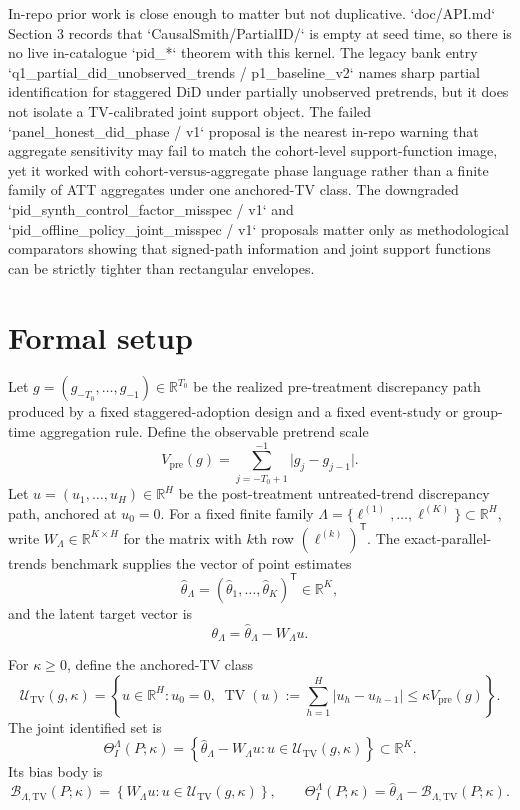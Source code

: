 \documentclass[11pt]{article}
\newcommand{\transpose}{\mathsf{T}}
\newcommand{\R}{\mathbb{R}}
\theoremstyle{definition}
\theoremstyle{plain}
\theoremstyle{remark}
\begin{document}
In-repo prior work is close enough to matter but not duplicative. `doc/API.md` Section 3 records that `CausalSmith/PartialID/` is empty at seed time, so there is no live in-catalogue `pid_*` theorem with this kernel. The legacy bank entry `q1_partial_did_unobserved_trends / p1_baseline_v2` names sharp partial identification for staggered DiD under partially unobserved pretrends, but it does not isolate a TV-calibrated joint support object. The failed `panel_honest_did_phase / v1` proposal is the nearest in-repo warning that aggregate sensitivity may fail to match the cohort-level support-function image, yet it worked with cohort-versus-aggregate phase language rather than a finite family of ATT aggregates under one anchored-TV class. The downgraded `pid_synth_control_factor_misspec / v1` and `pid_offline_policy_joint_misspec / v1` proposals matter only as methodological comparators showing that signed-path information and joint support functions can be strictly tighter than rectangular envelopes.

\section{Formal setup}
Let \(g=(g_{-T_0},\ldots,g_{-1})\in\R^{T_0}\) be the realized pre-treatment discrepancy path produced by a fixed staggered-adoption design and a fixed event-study or group-time aggregation rule. Define the observable pretrend scale
\[
V_{\mathrm{pre}}(g)=\sum_{j=-T_0+1}^{-1}\lvert g_j-g_{j-1}\rvert .
\]
Let \(u=(u_1,\ldots,u_H)\in\R^H\) be the post-treatment untreated-trend discrepancy path, anchored at \(u_0=0\). For a fixed finite family \(\Lambda=\{\ell^{(1)},\ldots,\ell^{(K)}\}\subset\R^H\), write \(W_\Lambda\in\R^{K\times H}\) for the matrix with \(k\)th row \((\ell^{(k)})^\transpose\). The exact-parallel-trends benchmark supplies the vector of point estimates
\[
\hat\theta_\Lambda=(\hat\theta_1,\ldots,\hat\theta_K)^\transpose\in\R^K,
\]
and the latent target vector is
\[
\theta_\Lambda=\hat\theta_\Lambda-W_\Lambda u.
\]

For \(\kappa\ge 0\), define the anchored-TV class
\[
\mathcal U_{\mathrm{TV}}(g,\kappa)
=
\left\{
u\in\R^H:
u_0=0,\;
\operatorname{TV}(u):=\sum_{h=1}^H \lvert u_h-u_{h-1}\rvert
\le \kappa V_{\mathrm{pre}}(g)
\right\}.
\]
The joint identified set is
\[
\Theta_I^\Lambda(P;\kappa)
=
\left\{
\hat\theta_\Lambda-W_\Lambda u:
u\in\mathcal U_{\mathrm{TV}}(g,\kappa)
\right\}\subset\R^K.
\]
Its bias body is
\[
\mathcal B_{\Lambda,\mathrm{TV}}(P;\kappa)
=
\left\{
W_\Lambda u:
u\in\mathcal U_{\mathrm{TV}}(g,\kappa)
\right\},
\qquad
\Theta_I^\Lambda(P;\kappa)=\hat\theta_\Lambda-\mathcal B_{\Lambda,\mathrm{TV}}(P;\kappa).
\]
\end{document}
